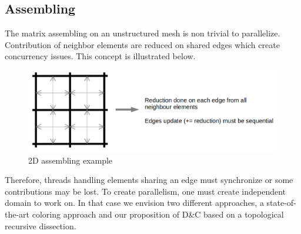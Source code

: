 \documentclass{IOS-Book-Article}
\begin{document}
\subsection{Assembling}
 The matrix assembling on an unstructured mesh is non trivial to parallelize. Contribution of neighbor elements are reduced on shared edges which create concurrency issues.
 This concept is illustrated below.
\begin{figure}[htp]
 \centering
 \label{fig0}
 \includegraphics[scale=0.2]{2D_assembly.png}
 \caption{2D assembling example}
\end{figure}

 Therefore, threads handling elements sharing an edge must synchronize or some contributions may be lost. To create parallelism, one must create independent domain to work on.
 In that case we envision two different approaches, a state-of-the-art coloring approach and our proposition of D\&C based on a topological recursive dissection.
\end{document}
